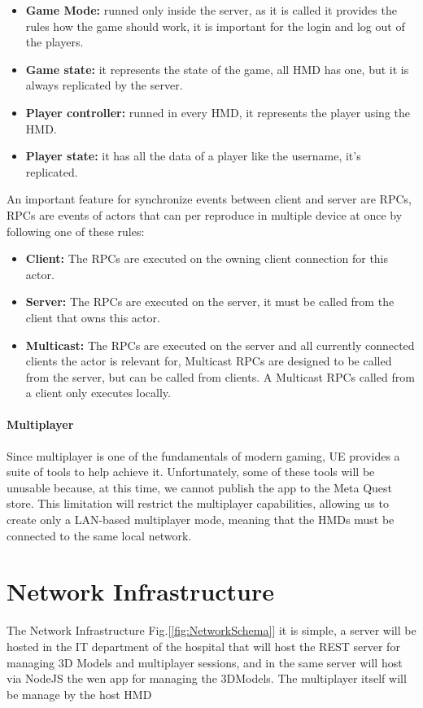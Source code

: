 \begin{itemize}
  \item \textbf{Game Mode:} runned only inside the server, as it is called it provides the rules how the game should work, it is important for the login and log out of the players.
  \item \textbf{Game state:} it represents the state of the game, all \ac{HMD} has one, but it is always replicated by the server.
  \item \textbf{Player controller:} runned in every \ac{HMD}, it represents the player using the \ac{HMD}.
  \item \textbf{Player state:} it has all the data of a player like the username, it's replicated.
\end{itemize}
\noindent
An important feature for synchronize events between client and server are \ac{RPCs}, \ac{RPCs} are events of actors that can per reproduce in multiple device at once by following one of these rules:
\begin{itemize}
  \item \textbf{Client:} The \ac{RPCs} are executed on the owning client connection for this actor.
  \item \textbf{Server:} The \ac{RPCs} are executed on the server, it must be called from the client that owns this actor.
  \item \textbf{Multicast:} The \ac{RPCs} are executed on the server and all currently connected clients the actor is relevant for, Multicast \ac{RPCs} are designed to be called from the server, but can be called from clients. A Multicast \ac{RPCs} called from a client only executes locally.
\end{itemize}

\paragraph{Multiplayer}
Since multiplayer is one of the fundamentals of modern gaming, \ac{UE} provides a suite of tools to help achieve it.
Unfortunately, some of these tools will be unusable because, at this time, we cannot publish the app to the Meta Quest store.
This limitation will restrict the multiplayer capabilities, allowing us to create only a LAN-based multiplayer mode, meaning that the \ac{HMD}s must be connected to the same local network.

\section{Network Infrastructure}
\noindent
The Network Infrastructure Fig.[\ref{fig:NetworkSchema}] it is simple, a server will be hosted in the IT department of the hospital that will host the \ac{REST} server for managing 3D Models and multiplayer sessions,
and in the same server will host via NodeJS the wen app for managing the 3DModels.
The multiplayer itself will be manage by the host \ac{HMD}


